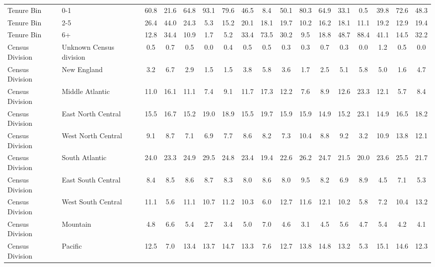 \begin{tabular}{llccccc|ccccc|ccccc}
Tenure Bin&0-1&60.8&21.6&64.8&93.1&79.6&46.5&8.4&50.1&80.3&64.9&33.1&0.5&39.8&72.6&48.3\\
Tenure Bin&2-5&26.4&44.0&24.3&5.3&15.2&20.1&18.1&19.7&10.2&16.2&18.1&11.1&19.2&12.9&19.4\\
Tenure Bin&6+&12.8&34.4&10.9&1.7&5.2&33.4&73.5&30.2&9.5&18.8&48.7&88.4&41.1&14.5&32.2\\
Census Division&Unknown Census division&0.5&0.7&0.5&0.0&0.4&0.5&0.5&0.3&0.3&0.7&0.3&0.0&1.2&0.5&0.0\\
Census Division&New England&3.2&6.7&2.9&1.5&1.5&3.8&5.8&3.6&1.7&2.5&5.1&5.8&5.0&1.6&4.7\\
Census Division&Middle Atlantic&11.0&16.1&11.1&7.4&9.1&11.7&17.3&12.2&7.6&8.9&12.6&23.3&12.1&5.7&8.4\\
Census Division&East North Central&15.5&16.7&15.2&19.0&18.9&15.5&19.7&15.9&15.9&14.9&15.2&23.1&14.9&16.5&18.2\\
Census Division&West North Central&9.1&8.7&7.1&6.9&7.7&8.6&8.2&7.3&10.4&8.8&9.2&3.2&10.9&13.8&12.1\\
Census Division&South Atlantic&24.0&23.3&24.9&29.5&24.8&23.4&19.4&22.6&26.2&24.7&21.5&20.0&23.6&25.5&21.7\\
Census Division&East South Central&8.4&8.5&8.6&8.7&8.3&8.0&8.6&8.0&9.5&8.2&6.9&8.9&4.5&7.1&5.3\\
Census Division&West South Central&11.1&5.6&11.1&10.7&11.2&10.3&6.0&12.7&11.6&12.1&10.2&5.8&7.2&10.4&13.2\\
Census Division&Mountain&4.8&6.6&5.4&2.7&3.4&5.0&7.0&4.6&3.1&4.5&5.6&4.7&5.4&4.2&4.1\\
Census Division&Pacific&12.5&7.0&13.4&13.7&14.7&13.3&7.6&12.7&13.8&14.8&13.2&5.3&15.1&14.6&12.3\\
\hline\hline
\end{tabular}
